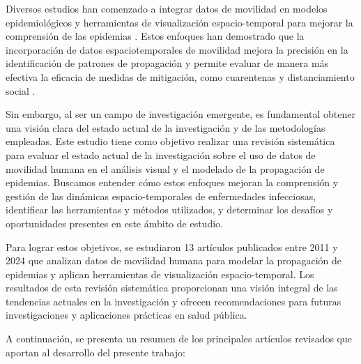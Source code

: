 \documentclass[sigconf]{acmart}
\begin{document}
Diversos estudios han comenzado a integrar datos de movilidad en modelos epidemiológicos y herramientas de visualización espacio-temporal para mejorar la comprensión de las epidemias \cite{li2024vivian, kim2024scoping}. Estos enfoques han demostrado que la incorporación de datos espaciotemporales de movilidad mejora la precisión en la identificación de patrones de propagación y permite evaluar de manera más efectiva la eficacia de medidas de mitigación, como cuarentenas y distanciamiento social \cite{yanez2021pandemcap, afzal2011visual}.

Sin embargo, al ser un campo de investigación emergente, es fundamental obtener una visión clara del estado actual de la investigación y de las metodologías empleadas. Este estudio tiene como objetivo realizar una revisión sistemática para evaluar el estado actual de la investigación sobre el uso de datos de movilidad humana en el análisis visual y el modelado de la propagación de epidemias. Buscamos entender cómo estos enfoques mejoran la comprensión y gestión de las dinámicas espacio-temporales de enfermedades infecciosas, identificar las herramientas y métodos utilizados, y determinar los desafíos y oportunidades presentes en este ámbito de estudio.

Para lograr estos objetivos, se estudiaron 13 artículos publicados entre 2011 y 2024 que analizan datos de movilidad humana para modelar la propagación de epidemias y aplican herramientas de visualización espacio-temporal. Los resultados de esta revisión sistemática proporcionan una visión integral de las tendencias actuales en la investigación y ofrecen recomendaciones para futuras investigaciones y aplicaciones prácticas en salud pública.

A continuación, se presenta un resumen de los principales artículos revisados que aportan al desarrollo del presente trabajo:
\end{document}
